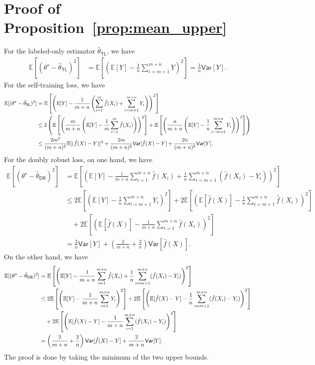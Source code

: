 \section{Proof of Proposition~\ref{prop:mean_upper}}\label{proof:mean_upper}
For the labeled-only estimator $\hat \theta_{\mathsf{TL}}$, we have
 \begin{align*}
    \mathbb{E}[(\theta^\star -  \hat \theta_{\mathsf{TL}})^2] & = \mathbb{E}\left[\left(\mathbb{E}[Y] - \frac{1}{n} \sum_{i=m+1}^{m+n} Y\right)^2\right] = \frac{1}{n} \mathsf{Var}[Y].
\end{align*}
For the self-training loss, we have
  \begin{align*} 
      \mathbb{E}[(\theta^\star -  \hat \theta_{\mathsf{SL}})^2] &  =  \mathbb{E}\left[\left(\mathbb{E}[Y] - \frac{1}{m+n}\left(  \sum_{i=1}^m \hat f(X_i)+ \sum_{i=m+1}^{m+n} Y_i\right)\right)^2\right] \\
      & \leq 2 \left(\mathbb{E}\left[\left(\frac{m}{m+n}\left(\mathbb{E}[Y] - \frac{1}{m} \sum_{i=1}^m \hat f(X_i)\right)\right)^2\right] +\mathbb{E}\left[\left(\frac{n}{m+n}\left(\mathbb{E}[Y] - \frac{1}{n} \sum_{i=m+1}^{m+n} Y_i \right) \right)^2\right] \right) \\
      & \leq \frac{2m^2}{(m+n)^2} \mathbb{E}[(\hat f(X)-Y)]^2 + \frac{2m}{(m+n)^2}\mathsf{Var}[{\hat f(X)-Y}]  + \frac{2n}{(m+n)^2} \mathsf{Var}[Y].  
\end{align*} 
For the doubly robust loss, on one hand, we have
\begin{align*}
       \mathbb{E}[(\theta^\star -  \hat \theta_{\mathsf{DR}})^2] & = 
 \mathbb{E}\left[\left(\mathbb{E}[Y] -   \frac{1}{m+n}  \sum_{i=1}^{m+n} \hat f(X_i) + \frac{1}{n}  \sum_{i=m+1}^{m+n} ( \hat f(X_i)-Y_i)\right)^2\right] \\ 
 & \leq 2  \mathbb{E}\left[\left(\mathbb{E}[Y] - \frac{1}{n} \sum_{i=m+1}^{m+n}   Y_i\right)^2\right] + 2  \mathbb{E}\left[\left(\mathbb{E}[\hat f(X)] - \frac{1}{n} \sum_{i=m+1}^{m+n}   \hat f(X_i)\right)^2\right]\\ 
 & \quad  +  2  \mathbb{E}\left[\left(\mathbb{E}[\hat f(X)] - \frac{1}{m+n} \sum_{i=1}^{m+n}   \hat f(X_i)\right)^2\right] \\
 & = \frac{2}{n} \mathsf{Var}[Y]+ \left(\frac{2}{m+n } + \frac{2}{n }\right)\mathsf{Var}[\hat f(X)].
\end{align*}
On the other hand, we have
\begin{align*}
       \mathbb{E}[(\theta^\star -  \hat \theta_{\mathsf{DR}})^2] & = 
 \mathbb{E}\left[\left(\mathbb{E}[Y] -   \frac{1}{m+n}  \sum_{i=1}^{m+n} \hat f(X_i) + \frac{1}{n}  \sum_{i=m+1}^{m+n} ( \hat f(X_i)-Y_i)\right)^2\right] \\ 
 & \leq 2  \mathbb{E}\left[\left(\mathbb{E}[Y] - \frac{1}{m+n} \sum_{i=1}^{m+n}   Y_i\right)^2\right] + 2  \mathbb{E}\left[\left(\mathbb{E}[\hat f(X) - Y] - \frac{1}{n} \sum_{i=m+1}^{m+n}  ( \hat f(X_i)-Y_i)\right)^2\right]\\ 
 & \quad  +  2  \mathbb{E}\left[\left(\mathbb{E}[\hat f(X)-Y] - \frac{1}{m+n} \sum_{i=1}^{m+n}   (\hat f(X_i)-Y_i)\right)^2\right] \\
 & = \left(\frac{2}{m+n}+ \frac{2}{n}\right)\mathsf{Var}[{\hat f(X)-Y}]  + \frac{2}{m+n} \mathsf{Var}[Y] .
\end{align*}
The proof is done by taking the minimum of the two upper bounds.
